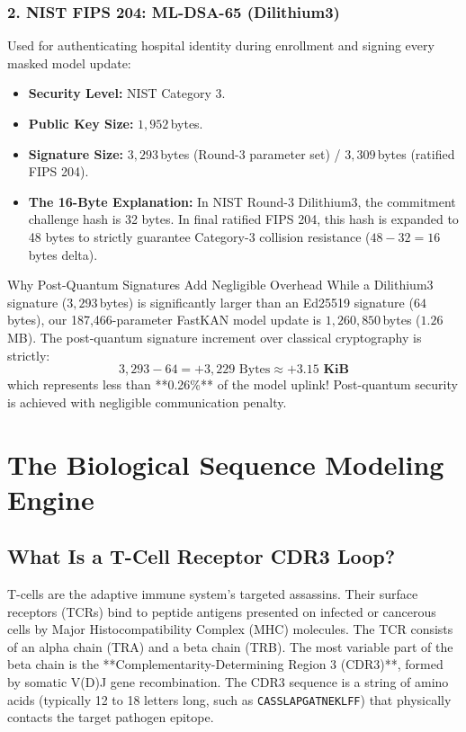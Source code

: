 \documentclass[11pt,a4paper]{report}
\begin{document}
\subsection{2. NIST FIPS 204: ML-DSA-65 (Dilithium3)}
Used for authenticating hospital identity during enrollment and signing every masked model update:
\begin{itemize}[itemsep=1pt]
  \item \textbf{Security Level:} NIST Category 3.
  \item \textbf{Public Key Size:} $1{,}952$\,bytes.
  \item \textbf{Signature Size:} $3{,}293$\,bytes (Round-3 parameter set) / $3{,}309$\,bytes (ratified FIPS 204).
  \item \textbf{The 16-Byte Explanation:} In NIST Round-3 Dilithium3, the commitment challenge hash is 32 bytes. In final ratified FIPS 204, this hash is expanded to 48 bytes to strictly guarantee Category-3 collision resistance ($48 - 32 = 16$\,bytes delta).
\end{itemize}

\begin{infobox}{Why Post-Quantum Signatures Add Negligible Overhead}
While a Dilithium3 signature ($3{,}293$\,bytes) is significantly larger than an Ed25519 signature ($64$\,bytes), our 187,466-parameter FastKAN model update is $1{,}260{,}850$\,bytes ($1.26$\,MB).
The post-quantum signature increment over classical cryptography is strictly:
\begin{equation}
3{,}293 - 64 = +3{,}229 \text{ Bytes} \approx \mathbf{+3.15 \text{ KiB}}
\end{equation}
which represents less than **0.26\%** of the model uplink! Post-quantum security is achieved with negligible communication penalty.
\end{infobox}

\chapter{The Biological Sequence Modeling Engine}
\label{chap:ml}

\section{What Is a T-Cell Receptor CDR3 Loop?}
T-cells are the adaptive immune system's targeted assassins. Their surface receptors (TCRs) bind to peptide antigens presented on infected or cancerous cells by Major Histocompatibility Complex (MHC) molecules.
The TCR consists of an alpha chain (TRA) and a beta chain (TRB). The most variable part of the beta chain is the **Complementarity-Determining Region 3 (CDR3)**, formed by somatic V(D)J gene recombination. The CDR3 sequence is a string of amino acids (typically 12 to 18 letters long, such as \lstinline|CASSLAPGATNEKLFF|) that physically contacts the target pathogen epitope.
\end{document}
